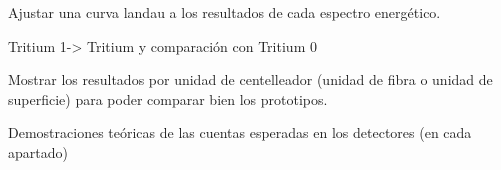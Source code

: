 Ajustar una curva landau a los resultados de cada espectro energético.

Tritium 1-> Tritium y comparación con Tritium 0

Mostrar los resultados por unidad de centelleador (unidad de fibra o unidad de superficie) para poder comparar bien los prototipos.

Demostraciones teóricas de las cuentas esperadas en los detectores (en cada apartado)